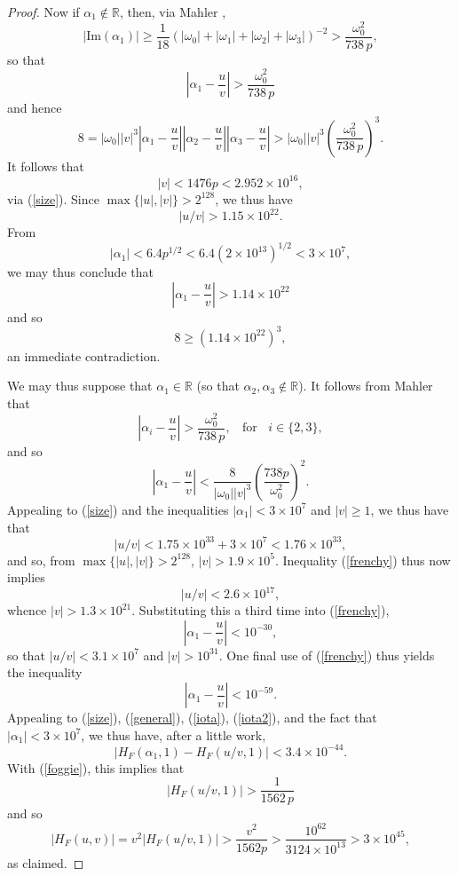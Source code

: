 \begin{proof}
Now if $\alpha_1 \not\in \mathbb{R}$, then, via Mahler \cite{Mah},
$$
\left| \mbox{Im} (\alpha_1) \right|  \geq \frac{1}{18} \left( |\omega_0|+|\omega_1|+|\omega_2|+|\omega_3| \right)^{-2} > \frac{\omega_0^2}{738 \, p},
$$
so that
$$
\left| \alpha_1 - \frac{u}{v} \right|> \frac{\omega_0^2}{738 \, p}
$$
and hence
$$
8 = |\omega_0| |v|^3 \left| \alpha_1 - \frac{u}{v} \right| \left| \alpha_2 - \frac{u}{v} \right| \left| \alpha_3 - \frac{u}{v} \right| > |\omega_0| |v|^3 \left( \frac{\omega_0^2}{738 \, p} \right)^3.
$$
It follows that
$$
|v| < 1476 p < 2.952 \times 10^{16},
$$
via (\ref{size}). Since $\max \{ |u|, |v| \} > 2^{128}$, we thus have
$$
\left| u/v \right| > 1.15 \times 10^{22}.
$$
From
$$
|\alpha_1| < 6.4 p^{1/2} < 6.4 \left( 2 \times 10^{13} \right)^{1/2} <3 \times 10^7, 
$$
we may thus conclude that
$$
\left| \alpha_1 - \frac{u}{v} \right|> 1.14 \times 10^{22}
$$
and so
$$
8 \geq \left( 1.14 \times 10^{22} \right)^3,
$$
an immediate contradiction.

We may thus suppose that $\alpha_1 \in \mathbb{R}$ (so that $\alpha_2, \alpha_3 \not\in \mathbb{R}$).  It follows from Mahler \cite{Mah} that
$$
\left| \alpha_i - \frac{u}{v} \right|> \frac{\omega_0^2}{738 \, p}, \; \; \mbox{ for } \; \; i \in \{ 2, 3 \},
$$
and so
\begin{equation} \label{frenchy}
\left| \alpha_1 - \frac{u}{v} \right| < \frac{8}{|\omega_0| |v|^3} \left( \frac{738 p }{\omega_0^2} \right)^2.
\end{equation}
Appealing to (\ref{size}) and the inequalities $|\alpha_1| < 3 \times 10^7$ and $|v| \geq 1$, we thus have that
$$
|u/v| <1.75 \times 10^{33} + 3 \times 10^7 < 1.76 \times 10^{33},
$$
and so, from $\max \{ |u|, |v| \} > 2^{128}$, $|v| > 1.9 \times 10^5$. Inequality (\ref{frenchy}) thus now implies 
$$
|u/v| < 2.6 \times 10^{17},
$$
whence $|v| > 1.3 \times 10^{21}$. Substituting this a third time into (\ref{frenchy}), 
$$
\left| \alpha_1 - \frac{u}{v} \right| <10^{-30},
$$
so that $|u/v| < 3.1 \times 10^7$ and $|v| > 10^{31}$. One final use of (\ref{frenchy}) thus yields the inequality
$$
\left| \alpha_1 - \frac{u}{v} \right| <10^{-59}.
$$
Appealing to (\ref{size}), (\ref{general}), (\ref{iota}), (\ref{iota2}), and the fact that $|\alpha_1| < 3 \times 10^7$, we thus have, after a little work,
$$
\left| H_F (\alpha_1,1) - H_F (u/v,1) \right| < 3.4 \times 10^{-44}.
$$
With (\ref{foggie}), this implies that
$$
\left|  H_F (u/v,1)  \right| > \frac{1}{1562 \, p}
$$
and so
$$
|H_F(u,v)| = v^2 \left| H_F(u/v,1) \right| > \frac{v^2 }{1562 p} > \frac{10^{62}}{3124 \times 10^{13}} > 3 \times 10^{45},
$$
as claimed.
\end{proof}



